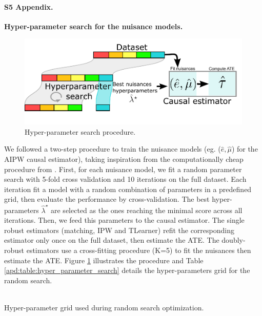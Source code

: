 \documentclass[10pt,letterpaper]{article}
\begin{document}
\paragraph*{S5 Appendix.}
\label{apd:hyper_parameter_search}
{\bf Hyper-parameter search for the nuisance models.}
\begin{figure}[!b]
  \begin{minipage}{.38\linewidth}
    \caption{Hyper-parameter search procedure.}\label{apd:fig:hyper_parameter_search}
  \end{minipage}%
  \hfill
  \begin{minipage}{.6\linewidth}
    \includegraphics[width=\linewidth]{img_supp/hp_search_procedure.pdf}
  \end{minipage}%
\end{figure}
We followed a two-step procedure to train the nuisance models (eg. ($\hat e,
  \hat \mu$) for the AIPW causal estimator), taking inspiration from the
computationally cheap procedure from
\cite[section~3.3]{bouthillier2021accounting}. First, for each nuisance
model, we fit a random parameter search with 5-fold cross validation and 10
iterations on the full dataset. Each iteration fit a model with a random
combination of parameters in a predefined grid, then evaluate the
performance by cross-validation. The best hyper-parameters $\hat
  \lambda^{\star}$ are selected as the ones reaching the minimal score across
all iterations. Then, we feed this parameters to the causal estimator. The
single robust estimators (matching, IPW and TLearner) refit the
corresponding estimator only once on the full dataset, then estimate the
ATE. The doubly-robust estimators use a cross-fitting procedure (K=5) to fit
the nuisances then estimate the ATE. Figure
\ref{apd:fig:hyper_parameter_search} illustrates the procedure and Table
\ref{apd:table:hyper_parameter_search} details the hyper-parameters grid for
the random search.


\begin{table}[]
  \resizebox{\textwidth}{!}{%
    
  }\\
  \caption{Hyper-parameter grid used during random search
    optimization.}\label{apd:table:hyper_parameter_search}
\end{table}
\clearpage
\end{document}
